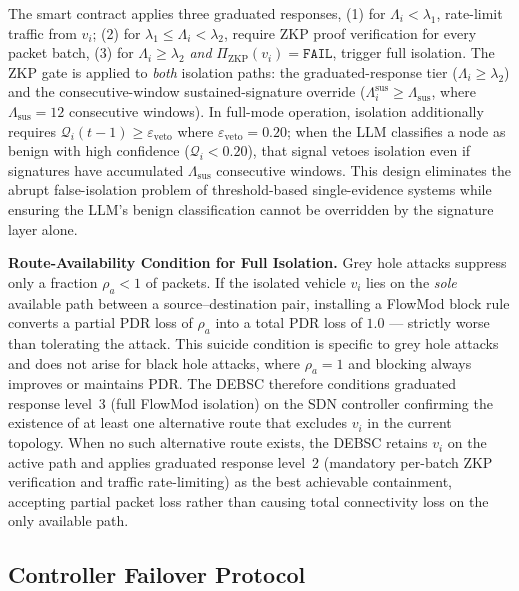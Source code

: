 \documentclass[12pt, a4paper]{report}
\newcommand{\mypar}{\vspace{0.8em}\noindent}
\begin{document}
The smart contract applies three graduated responses, (1) for
$\Lambda_i < \lambda_1$, rate-limit traffic from $v_i$; (2) for
$\lambda_1 \leq \Lambda_i < \lambda_2$, require ZKP proof verification
for every packet batch, (3) for $\Lambda_i \geq \lambda_2$ \emph{and}
$\Pi_{\mathrm{ZKP}}(v_i) = \texttt{FAIL}$, trigger full isolation.
The ZKP gate is applied to \emph{both} isolation paths: the
graduated-response tier ($\Lambda_i \geq \lambda_2$) and the
consecutive-window sustained-signature override
($\Lambda_i^{\mathrm{sus}} \geq \Lambda_{\mathrm{sus}}$, where
$\Lambda_{\mathrm{sus}}=12$ consecutive windows). In full-mode
operation, isolation additionally requires $\mathcal{Q}_i(t-1) \geq
\varepsilon_{\mathrm{veto}}$ where $\varepsilon_{\mathrm{veto}}=0.20$;
when the LLM classifies a node as benign with high confidence
($\mathcal{Q}_i < 0.20$), that signal vetoes isolation even if
signatures have accumulated $\Lambda_{\mathrm{sus}}$ consecutive windows.
This design eliminates the abrupt false-isolation problem of
threshold-based single-evidence systems while ensuring the LLM's
benign classification cannot be overridden by the signature layer alone.

\mypar
\textbf{Route-Availability Condition for Full Isolation.}
Grey hole attacks suppress only a fraction $\rho_a < 1$ of
packets. If the isolated vehicle $v_i$ lies on the \emph{sole}
available path between a source--destination pair, installing a
FlowMod block rule converts a partial PDR loss of $\rho_a$ into
a total PDR loss of $1.0$ — strictly worse than tolerating the
attack. This suicide condition is specific to grey hole attacks
and does not arise for black hole attacks, where $\rho_a = 1$
and blocking always improves or maintains PDR. The DEBSC
therefore conditions graduated response level~3 (full
FlowMod isolation) on the SDN controller confirming the
existence of at least one alternative route that excludes
$v_i$ in the current topology. When no such alternative route
exists, the DEBSC retains $v_i$ on the active path and applies
graduated response level~2 (mandatory per-batch ZKP
verification and traffic rate-limiting) as the best achievable
containment, accepting partial packet loss rather than causing
total connectivity loss on the only available path.

\subsection{Controller Failover Protocol}
\label{sec:failover}
\end{document}
